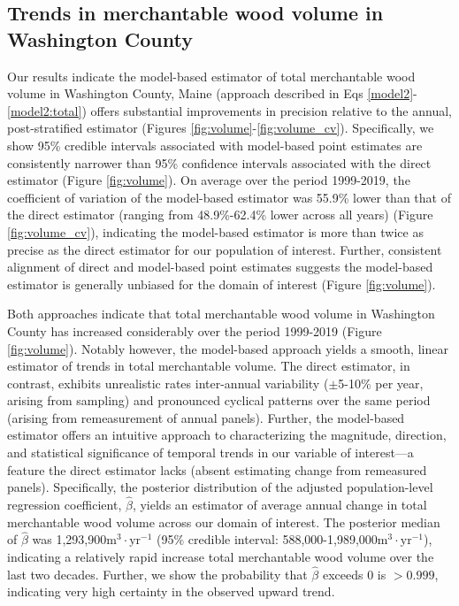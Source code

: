 \documentclass[11pt]{article}
\begin{document}
\subsection*{Trends in merchantable wood volume in Washington County}
Our results indicate the model-based estimator of total merchantable wood volume in Washington County, Maine (approach described in Eqs \ref{model2}-\ref{model2:total}) offers substantial improvements in precision relative to the annual, post-stratified estimator (Figures \ref{fig:volume}-\ref{fig:volume_cv}). Specifically, we show 95\% credible intervals associated with model-based point estimates are consistently narrower than 95\% confidence intervals associated with the direct estimator (Figure \ref{fig:volume}). On average over the period 1999-2019, the coefficient of variation of the model-based estimator was 55.9\% lower than that of the direct estimator (ranging from 48.9\%-62.4\% lower across all years) (Figure \ref{fig:volume_cv}), indicating the model-based estimator is more than twice as precise as the direct estimator for our population of interest. Further, consistent alignment of direct and model-based point estimates suggests the model-based estimator is generally unbiased for the domain of interest (Figure \ref{fig:volume}). 

Both approaches indicate that total merchantable wood volume in Washington County has increased considerably over the period 1999-2019 (Figure \ref{fig:volume}). Notably however, the model-based approach yields a smooth, linear estimator of trends in total merchantable volume. The direct estimator, in contrast, exhibits unrealistic rates inter-annual variability ($\pm$5-10\% per year, arising from sampling) and pronounced cyclical patterns over the same period (arising from remeasurement of annual panels). Further, the model-based estimator offers an intuitive approach to characterizing the magnitude, direction, and statistical significance of temporal trends in our variable of interest---a feature the direct estimator lacks (absent estimating change from remeasured panels). Specifically, the posterior distribution of the adjusted population-level regression coefficient, $\hat{\beta}$, yields an estimator of average annual change in total merchantable wood volume across our domain of interest. The posterior median of $\hat{\beta}$ was 1,293,900$\mathrm{m}^3 \cdot \mathrm{yr}^{-1}$ (95\% credible interval: 588,000-1,989,000$\mathrm{m}^3 \cdot \mathrm{yr}^{-1}$), indicating a relatively rapid increase total merchantable wood volume over the last two decades. Further, we show the probability that $\hat{\beta}$ exceeds 0 is $>0.999$, indicating very high certainty in the observed upward trend.  
\end{document}
